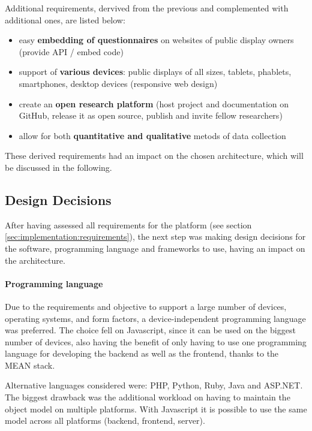 	Additional requirements, dervived from the previous and complemented with additional ones, are listed below:

	\begin{itemize}[itemsep=0pt] 
	\item easy \textbf{embedding of questionnaires} on websites of public display owners (provide API / embed code)
	\item support of \textbf{various devices}: public displays of all sizes, tablets, phablets, smartphones, desktop devices (responsive web design)
	\item create an \textbf{open research platform} (host project and documentation on GitHub, release it as open source, publish and invite fellow researchers)
	\item allow for both \textbf{quantitative and qualitative} metods of data collection
	\end{itemize}


	These derived requirements had an impact on the chosen architecture, which will be discussed in the following.



\subsection{Design Decisions}
\label{sec:implementation:design-decisions}

	After having assessed all requirements for the platform (see section \ref{sec:implementation:requirements}), the next step was making design decisions for the software, programming language and frameworks to use, having an impact on the architecture.


	\paragraph{Programming language}

		Due to the requirements and objective to support a large number of devices, operating systems, and form factors, a device-independent programming language was preferred. 
		The choice fell on Javascript, since it can be used on the biggest number of devices, also having the benefit of only having to use one programming language for developing the backend as well as the frontend, thanks to the MEAN stack.

		Alternative languages considered were: PHP, Python, Ruby, Java and ASP.NET. The biggest drawback was the additional workload on having to maintain the object model on multiple platforms. With Javascript it is possible to use the same model across all platforms (backend, frontend, server).



